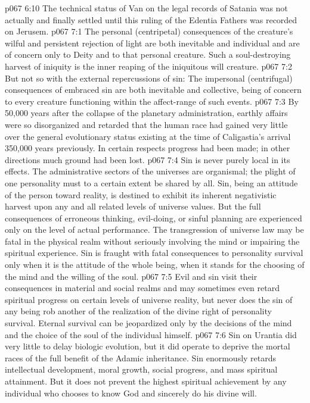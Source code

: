 \vs p067 6:10 The technical status of Van on the legal records of Satania was not actually and finally settled until this ruling of the Edentia Fathers was recorded on Jerusem.
\vs p067 7:1 The personal (centripetal) consequences of the creature’s wilful and persistent rejection of light are both inevitable and individual and are of concern only to Deity and to that personal creature. Such a soul\hyp{}destroying harvest of iniquity is the inner reaping of the iniquitous will creature.
\vs p067 7:2 But not so with the external repercussions of sin: The impersonal (centrifugal) consequences of embraced sin are both inevitable and collective, being of concern to every creature functioning within the affect\hyp{}range of such events.
\vs p067 7:3 By 50,000 years after the collapse of the planetary administration, earthly affairs were so disorganized and retarded that the human race had gained very little over the general evolutionary status existing at the time of Caligastia’s arrival 350,000 years previously. In certain respects progress had been made; in other directions much ground had been lost.
\vs p067 7:4 Sin is never purely local in its effects. The administrative sectors of the universes are organismal; the plight of one personality must to a certain extent be shared by all. Sin, being an attitude of the person toward reality, is destined to exhibit its inherent negativistic harvest upon any and all related levels of universe values. But the full consequences of erroneous thinking, evil\hyp{}doing, or sinful planning are experienced only on the level of actual performance. The transgression of universe law may be fatal in the physical realm without seriously involving the mind or impairing the spiritual experience. Sin is fraught with fatal consequences to personality survival only when it is the attitude of the whole being, when it stands for the choosing of the mind and the willing of the soul.
\vs p067 7:5 Evil and sin visit their consequences in material and social realms and may sometimes even retard spiritual progress on certain levels of universe reality, but never does the sin of any being rob another of the realization of the divine right of personality survival. Eternal survival can be jeopardized only by the decisions of the mind and the choice of the soul of the individual himself.
\vs p067 7:6 Sin on Urantia did very little to delay biologic evolution, but it did operate to deprive the mortal races of the full benefit of the Adamic inheritance. Sin enormously retards intellectual development, moral growth, social progress, and mass spiritual attainment. But it does not prevent the highest spiritual achievement by any individual who chooses to know God and sincerely do his divine will.
